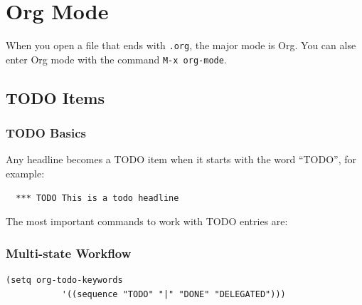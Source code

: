 \chapter{Org Mode}



When you open a file that ends with \verb|.org|, the major mode is Org. You can alse enter Org mode with the command \verb|M-x org-mode|.

\section{TODO Items}
\subsection{TODO Basics}
Any headline becomes a TODO item when it starts with the word ``TODO'', for example:
\begin{tcolorbox}
\begin{verbatim}
  *** TODO This is a todo headline
\end{verbatim}
\end{tcolorbox}

The most important commands to work with TODO entries are:
\begin{table}[!ht]
  \caption{TODO commands}
\end{table}




\subsection{Multi-state Workflow}
\begin{tcolorbox}
\begin{verbatim}
(setq org-todo-keywords
           '((sequence "TODO" "|" "DONE" "DELEGATED")))
\end{verbatim}
\end{tcolorbox}

